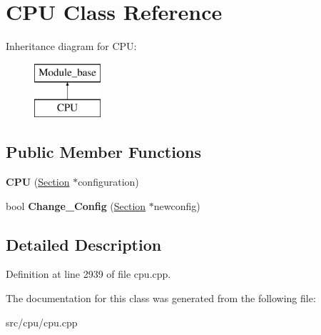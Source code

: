 \hypertarget{classCPU}{\section{C\-P\-U Class Reference}
\label{classCPU}
}
Inheritance diagram for C\-P\-U\-:\begin{figure}[H]
\begin{center}
\leavevmode
\includegraphics[height=2.000000cm]{classCPU}
\end{center}
\end{figure}
\subsection*{Public Member Functions}
\begin{DoxyCompactItemize}
\item 
\hypertarget{classCPU_a7ff8bd1e2634ffa09329984eb00fb890}{{\bfseries C\-P\-U} (\hyperlink{classSection}{Section} $\ast$configuration)}\label{classCPU_a7ff8bd1e2634ffa09329984eb00fb890}

\item 
\hypertarget{classCPU_a84dcaf3dac834731a61c49cacc77f910}{bool {\bfseries Change\-\_\-\-Config} (\hyperlink{classSection}{Section} $\ast$newconfig)}\label{classCPU_a84dcaf3dac834731a61c49cacc77f910}

\end{DoxyCompactItemize}


\subsection{Detailed Description}


Definition at line 2939 of file cpu.\-cpp.



The documentation for this class was generated from the following file\-:\begin{DoxyCompactItemize}
\item 
src/cpu/cpu.\-cpp\end{DoxyCompactItemize}
